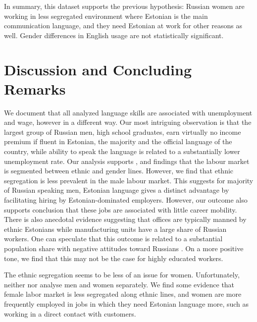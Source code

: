 \documentclass[12pt, a4paper]{article}
\begin{document}
In summary, this dataset supports the previous hypothesis: Russian women are
working in less segregated environment where Estonian is the main
communication language, and they need Estonian at work for other reasons as
well.  Gender differences in English usage are not statistically
significant.


\section{Discussion and Concluding Remarks}
\label{sec:discussion}

We document that all analyzed language skills are associated with
unemployment and wage, however in a different way. Our most
intriguing observation is that the largest group of
Russian men, high school graduates, earn virtually no income premium if fluent in Estonian,
the majority and the official language of the country, while ability
to speak the language is related to a substantially
lower unemployment rate.
Our analysis supports \citet{YaoandOurs2015}, and \citet{Lindemann2013} findings that
the labour market is segmented between ethnic and gender lines.
However, we find that ethnic segregation is less prevalent in the male
labour market.
This suggests for majority of Russian speaking men, Estonian
language gives a distinct advantage by facilitating hiring by
Estonian-dominated employers.  However, our outcome also supports 
\citet{leppik+vihalemm2015JofBaltStud} conclusion that
these
jobs are associated with little career mobility.  There is also
anecdotal evidence suggesting that offices are
typically manned by ethnic Estonians while manufacturing units have a
large share of Russian workers.
One can speculate that this outcome is related to a substantial population share
with negative attitudes toward Russians \citep{korts2009JofBaltStud}.
On a more positive tone, we find
that this may not be the case for highly educated workers.

The ethnic segregation seems to be less of an issue for women.
Unfortunately, neither \citet{Toomet2011} nor
\citet{leppik+vihalemm2015JofBaltStud} analyse men and women
separately.  We find some evidence that female labor market is less
segregated along ethnic lines, and women are more frequently employed in jobs in which they need Estonian
language more, such as working in a direct contact with customers.
\end{document}
